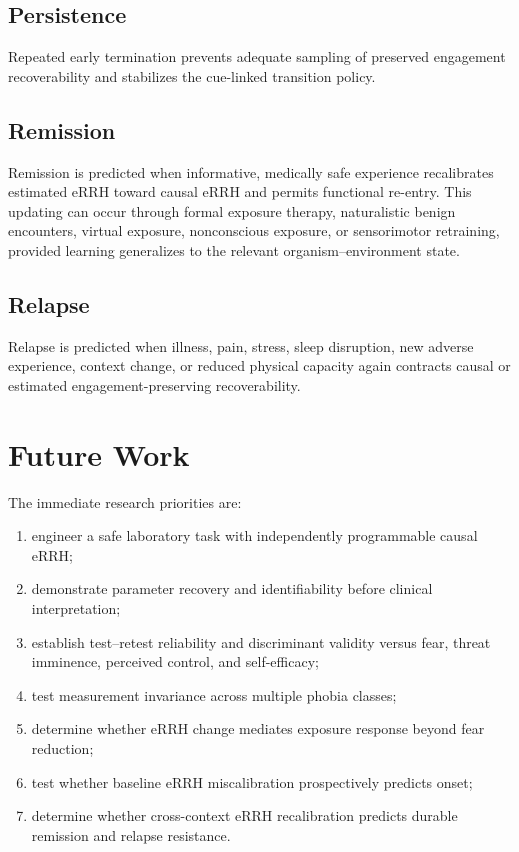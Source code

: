 \documentclass[11pt]{article}
\begin{document}
\subsection{Persistence}
Repeated early termination prevents adequate sampling of preserved engagement recoverability and stabilizes the cue-linked transition policy.

\subsection{Remission}
Remission is predicted when informative, medically safe experience recalibrates estimated eRRH toward causal eRRH and permits functional re-entry. This updating can occur through formal exposure therapy, naturalistic benign encounters, virtual exposure, nonconscious exposure, or sensorimotor retraining, provided learning generalizes to the relevant organism--environment state.

\subsection{Relapse}
Relapse is predicted when illness, pain, stress, sleep disruption, new adverse experience, context change, or reduced physical capacity again contracts causal or estimated engagement-preserving recoverability.

\section{Future Work}
The immediate research priorities are:
\begin{enumerate}[leftmargin=2em]
\item engineer a safe laboratory task with independently programmable causal eRRH;
\item demonstrate parameter recovery and identifiability before clinical interpretation;
\item establish test--retest reliability and discriminant validity versus fear, threat imminence, perceived control, and self-efficacy;
\item test measurement invariance across multiple phobia classes;
\item determine whether eRRH change mediates exposure response beyond fear reduction;
\item test whether baseline eRRH miscalibration prospectively predicts onset;
\item determine whether cross-context eRRH recalibration predicts durable remission and relapse resistance.
\end{enumerate}
\end{document}
